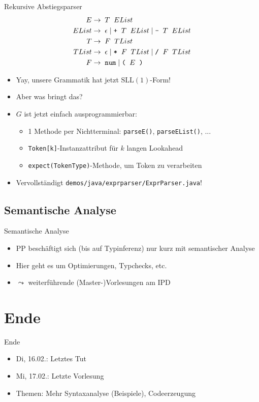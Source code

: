 \documentclass{beamer}
\begin{document}
\begin{frame}{Rekursive Abstiegsparser}
	\footnotesize
	\begin{align*}
		E     \to & \;\; T \;\; EList\\
		EList \to & \;\; \epsilon \mid \textrm{\texttt{+}} \;\; T \;\; EList \mid \textrm{\texttt{-}} \;\; T \;\; EList\\
		T     \to & \;\; F \;\; TList\\
		TList \to & \;\; \epsilon \mid \textrm{\texttt{*}} \;\; F \;\; TList \mid \textrm{\texttt{/}} \;\; F \;\; TList\\
		F \to & \;\; \textrm{\texttt{num}} \; | \; \textrm{\texttt{(}} \;\; E \;\; \textrm{\texttt{)}}
	\end{align*}
	\begin{itemize}
		\item Yay, unsere Grammatik hat jetzt $\textrm{SLL}(1)$-Form!
		\item Aber was bringt das?
		\pause
		\item $G$ ist jetzt einfach ausprogrammierbar:
		\begin{itemize}
			\item 1 Methode per Nichtterminal: \texttt{parseE()}, \texttt{parseEList()}, ...
			\item \texttt{Token[k]}-Instanzattribut für $k$ langen Lookahead
			\item \texttt{expect(TokenType)}-Methode, um Token zu verarbeiten
		\end{itemize}
		\pause
		\item Vervollständigt \texttt{demos/java/exprparser/ExprParser.java}!
	\end{itemize}
\end{frame}

\subsection{Semantische Analyse}

\begin{frame}{Semantische Analyse}
	\begin{itemize}
		\item PP beschäftigt sich (bis auf Typinferenz) nur kurz mit semantischer Analyse
		\item Hier geht es um Optimierungen, Typchecks, etc.
		\item $\leadsto$ weiterführende (Master-)Vorlesungen am IPD
	\end{itemize}
\end{frame}

\section{Ende}

\begin{frame}{Ende}
  \begin{itemize}
    \item Di, 16.02.: Letztes Tut
    \item Mi, 17.02.: Letzte Vorlesung
    \item Themen: Mehr Syntaxanalyse (Beispiele), Codeerzeugung
  \end{itemize}
\end{frame}
\end{document}
